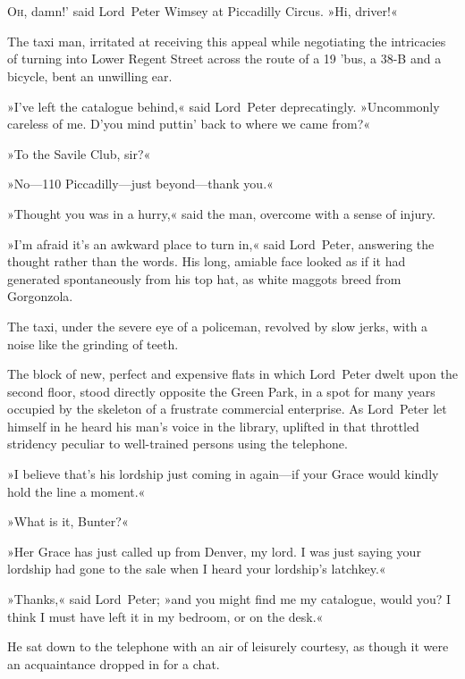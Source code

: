\chapter[Chapter \thechapter]{}
\lettrine[lines=4,ante=‘]{O}{h}, damn!' said Lord~Peter Wimsey at Piccadilly Circus. »Hi, driver!«

\zz
The taxi man, irritated at receiving this appeal while negotiating the intricacies of turning into Lower Regent Street across the route of a 19 'bus, a 38-B and a bicycle, bent an unwilling ear.

»I've left the catalogue behind,« said Lord~Peter deprecatingly. »Uncommonly careless of me. D'you mind puttin' back to where we came from?«

»To the Savile Club, sir?«

»No—110 Piccadilly—just beyond—thank you.«

»Thought you was in a hurry,« said the man, overcome with a sense of injury.

»I'm afraid it's an awkward place to turn in,« said Lord~Peter, answering the thought rather than the words. His long, amiable face looked as if it had generated spontaneously from his top hat, as white maggots breed from Gorgonzola.

The taxi, under the severe eye of a policeman, revolved by slow jerks, with a noise like the grinding of teeth.

The block of new, perfect and expensive flats in which Lord~Peter dwelt upon the second floor, stood directly opposite the Green Park, in a spot for many years occupied by the skeleton of a frustrate commercial enterprise. As Lord~Peter let himself in he heard his man's voice in the library, uplifted in that throttled stridency peculiar to well-trained persons using the telephone.

»I believe that's his lordship just coming in again—if your Grace would kindly hold the line a moment.«

»What is it, Bunter?«

»Her Grace has just called up from Denver, my lord. I was just saying your lordship had gone to the sale when I heard your lordship's latchkey.«

»Thanks,« said Lord~Peter; »and you might find me my catalogue, would you? I think I must have left it in my bedroom, or on the desk.«

He sat down to the telephone with an air of leisurely courtesy, as though it were an acquaintance dropped in for a chat.

